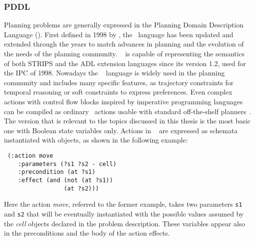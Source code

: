 \subsubsection{PDDL}
Planning problems are generally expressed in the Planning Domain
Description Language (\pddl).  First defined in 1998 by
\citeauthor{pddl}, the \pddl~language has been updated and extended
through the years to match advances in planning and the evolution of
the needs of the planning community.  \pddl ~ is capable of
representing the semantics of both STRIPS and the ADL extension\citep{pednault:adl} languages since its
version 1.2, used for the IPC of 1998.  Nowadays the \pddl ~ language
is widely used in the planning community and includes many specific
features, as trajectory
constraints for temporal reasoning or soft constraints to express
preferences.
%
Even complex actions with control flow blocks
inspired by imperative programming languages
 can be compiled as ordinary
\pddl~actions usable
with standard off-the-shelf planners~\citep{sheila:high-level, baier:extended,
  petrick:baseline, classen:gogol}.
%
The version that is relevant to the topics discussed in this thesis is
the most basic one with Boolean state variables only. Actions in
\pddl~ are expressed as schemata instantiated with objects, as shown
in the following example:
\begin{verbatim}
 (:action move
    :parameters (?s1 ?s2 - cell)
    :precondition (at ?s1)
    :effect (and (not (at ?s1))
                 (at ?s2)))
\end{verbatim}
Here the action \emph{move}, referred to the former example,
 takes two parameters \texttt{s1} and \texttt{s2} that will be
eventually instantiated with the possible values assumed by the
\emph{cell}  objects declared in the problem
description.  These variables appear also in the preconditions and the
body of the action effects.




